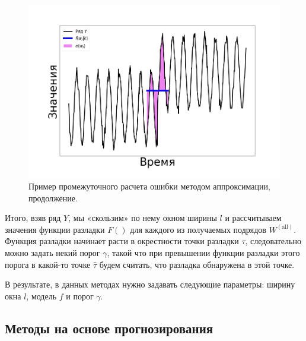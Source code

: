 \documentclass[%
12pt,
master,  %
natbib,      %
subf,        %
substylefile = spbu.rtx,
href,        %
colorlinks,  %
]{disser}
\begin{document}
\begin{figure}[!hhh]
	\begin{center}
		\includegraphics[width=12cm]{approaches_second_3_ru}
	\end{center}
	\vspace{-5mm}\caption{Пример промежуточного расчета ошибки методом аппроксимации, продолжение.}
	\label{fig:approximation_example_2}
\end{figure}


Итого, взяв ряд $Y$, мы «скользим» по нему окном ширины $l$ и рассчитываем значения функции разладки $F()$ для каждого из получаемых подрядов $W^{\mathrm{(all)}}$. Функция разладки начинает расти в окрестности точки разладки $\tau$, следовательно можно задать некий порог $\gamma$, такой что при превышении функции разладки этого порога в какой-то точке $\hat{\tau}$ будем считать, что разладка обнаружена в этой точке.

В результате, в данных методах нужно задавать следующие параметры: ширину окна $l$, модель $f$ и порог $\gamma$.

\subsection{Методы на основе прогнозирования}
\end{document}
